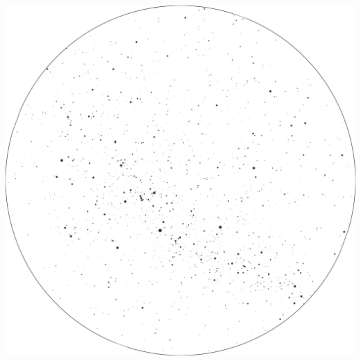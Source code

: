 \documentclass{./SAS-class-skygen}
\begin{document}
	\vspace{0.5cm}
    \begin{center}
    \includegraphics[width=\textwidth]{./pics/skychart39.png}
    \end{center}
    
    
\end{document}
